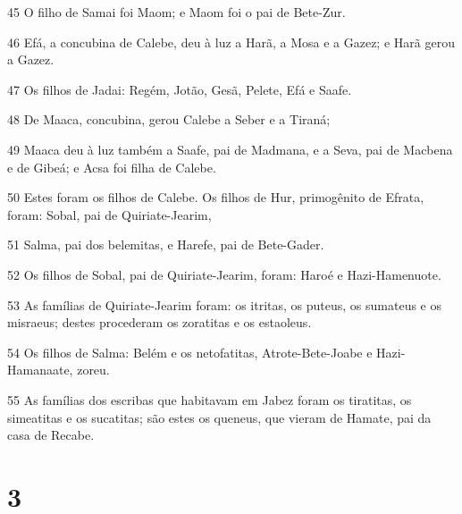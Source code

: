 \par 45 O filho de Samai foi Maom; e Maom foi o pai de Bete-Zur.
\par 46 Efá, a concubina de Calebe, deu à luz a Harã, a Mosa e a Gazez; e Harã gerou a Gazez.
\par 47 Os filhos de Jadai: Regém, Jotão, Gesã, Pelete, Efá e Saafe.
\par 48 De Maaca, concubina, gerou Calebe a Seber e a Tiraná;
\par 49 Maaca deu à luz também a Saafe, pai de Madmana, e a Seva, pai de Macbena e de Gibeá; e Acsa foi filha de Calebe.
\par 50 Estes foram os filhos de Calebe. Os filhos de Hur, primogênito de Efrata, foram: Sobal, pai de Quiriate-Jearim,
\par 51 Salma, pai dos belemitas, e Harefe, pai de Bete-Gader.
\par 52 Os filhos de Sobal, pai de Quiriate-Jearim, foram: Haroé e Hazi-Hamenuote.
\par 53 As famílias de Quiriate-Jearim foram: os itritas, os puteus, os sumateus e os misraeus; destes procederam os zoratitas e os estaoleus.
\par 54 Os filhos de Salma: Belém e os netofatitas, Atrote-Bete-Joabe e Hazi-Hamanaate, zoreu.
\par 55 As famílias dos escribas que habitavam em Jabez foram os tiratitas, os simeatitas e os sucatitas; são estes os queneus, que vieram de Hamate, pai da casa de Recabe.

\chapter{3}

